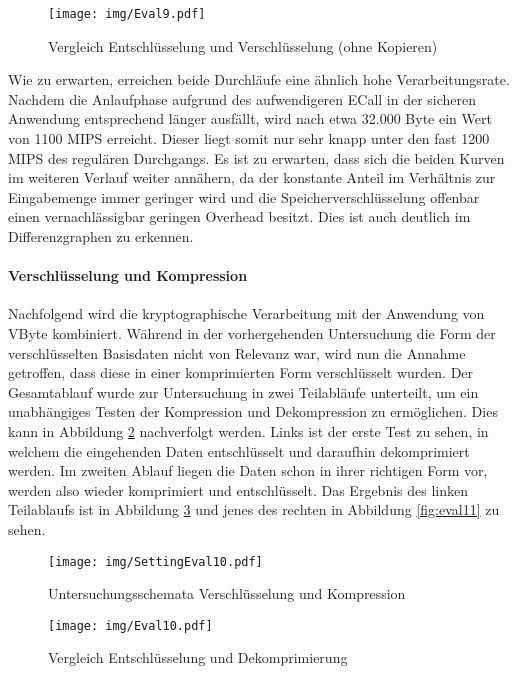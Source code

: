 \begin{figure}[h]
	\texttt{[image: img/Eval9.pdf]}
	\centering
	\caption{Vergleich Entschlüsselung und Verschlüsselung (ohne Kopieren)}
	\label{fig:eval9}
\end{figure}

Wie zu erwarten, erreichen beide Durchläufe eine ähnlich hohe Verarbeitungsrate. Nachdem die Anlaufphase aufgrund des aufwendigeren \ac{ECall} in der sicheren Anwendung entsprechend länger ausfällt, wird nach etwa 32.000 Byte ein Wert von 1100 \ac{MIPS} erreicht. Dieser liegt somit nur sehr knapp unter den fast 1200 \ac{MIPS} des regulären Durchgangs. Es ist zu erwarten, dass sich die beiden Kurven im weiteren Verlauf weiter annähern, da der konstante Anteil im Verhältnis zur Eingabemenge immer geringer wird und die Speicherverschlüsselung offenbar einen vernachlässigbar geringen Overhead besitzt. Dies ist auch deutlich im Differenzgraphen zu erkennen.

\paragraph{Verschlüsselung und Kompression}

Nachfolgend wird die kryptographische Verarbeitung mit der Anwendung von VByte kombiniert. Während in der vorhergehenden Untersuchung die Form der verschlüsselten Basisdaten nicht von Relevanz war, wird nun die Annahme getroffen, dass diese in einer komprimierten Form verschlüsselt wurden. Der Gesamtablauf wurde zur Untersuchung in zwei Teilabläufe unterteilt, um ein unabhängiges Testen der Kompression und Dekompression zu ermöglichen. Dies kann in Abbildung \ref{fig:settingeval10} nachverfolgt werden. Links ist der erste Test zu sehen, in welchem die eingehenden Daten entschlüsselt und daraufhin dekomprimiert werden. Im zweiten Ablauf liegen die Daten schon in ihrer richtigen Form vor, werden also wieder komprimiert und entschlüsselt. Das Ergebnis des linken Teilablaufs ist in Abbildung \ref{fig:eval10} und jenes des rechten in Abbildung \ref{fig:eval11} zu sehen.

\begin{figure}[h]
	\texttt{[image: img/SettingEval10.pdf]}
	\centering
	\caption{Untersuchungsschemata Verschlüsselung und Kompression}
	\label{fig:settingeval10}
\end{figure}

\begin{figure}[h]
	\texttt{[image: img/Eval10.pdf]}
	\centering
	\caption{Vergleich Entschlüsselung und Dekomprimierung}
	\label{fig:eval10}
\end{figure}

